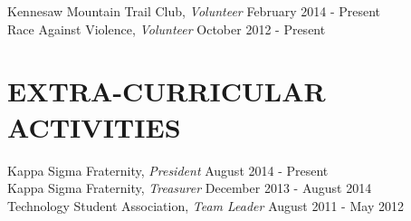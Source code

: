 \documentclass[margin, 10pt]{res} %
\begin{document}
\begin{resume}
Kennesaw Mountain Trail Club, {\sl Volunteer} \hfill February 2014 - Present \\
Race Against Violence, {\sl Volunteer} \hfill October 2012 - Present \\


\section{EXTRA-CURRICULAR \\ ACTIVITIES} 

Kappa Sigma Fraternity, {\sl President} \hfill August 2014 - Present\\
Kappa Sigma Fraternity, {\sl Treasurer} \hfill December 2013 - August 2014 \\
Technology Student Association, {\sl Team Leader} \hfill August 2011 - May 2012 \\
 


\end{resume}
\end{document}
